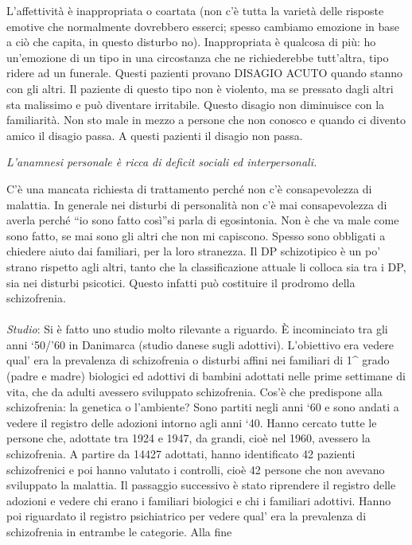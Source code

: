 L'affettività è inappropriata o coartata (non c'è tutta la varietà delle
risposte emotive che normalmente dovrebbero esserci; spesso cambiamo
emozione in base a ciò che capita, in questo disturbo no). Inappropriata
è qualcosa di più: ho un'emozione di un tipo in una circostanza che ne
richiederebbe tutt'altra, tipo ridere ad un funerale. Questi pazienti
provano DISAGIO ACUTO quando stanno con gli altri. Il paziente di questo
tipo non è violento, ma se pressato dagli altri sta malissimo e può
diventare irritabile. Questo disagio non diminuisce con la familiarità.
Non sto male in mezzo a persone che non conosco e quando ci divento
amico il disagio passa. A questi pazienti il disagio non passa.

\emph{\emph{L'anamnesi personale è ricca di deficit sociali ed
interpersonali. }}

C'è una mancata richiesta di trattamento perché non c'è consapevolezza
di malattia. In generale nei disturbi di personalità non c'è mai
consapevolezza di averla perché ``io sono fatto così''si parla di
egosintonia. Non è che va male come sono fatto, se mai sono gli altri
che non mi capiscono. Spesso sono obbligati a chiedere aiuto dai
familiari, per la loro stranezza. Il DP schizotipico è un po' strano
rispetto agli altri, tanto che la classificazione attuale li colloca sia
tra i DP, sia nei disturbi psicotici. Questo infatti può costituire il
prodromo della schizofrenia.
\\\\
\emph{Studio}: Si è fatto uno studio molto rilevante a riguardo. È
incominciato tra gli anni `50/'60 in Danimarca (studio danese sugli
adottivi). L'obiettivo era vedere qual' era la prevalenza di
schizofrenia o disturbi affini nei familiari di 1\^{} grado (padre e
madre) biologici ed adottivi di bambini adottati nelle prime settimane
di vita, che da adulti avessero sviluppato schizofrenia. Cos'è che
predispone alla schizofrenia: la genetica o l'ambiente? Sono partiti
negli anni `60 e sono andati a vedere il registro delle adozioni intorno
agli anni `40. Hanno cercato tutte le persone che, adottate tra 1924 e
1947, da grandi, cioè nel 1960, avessero la schizofrenia. A partire da
14427 adottati, hanno identificato 42 pazienti schizofrenici e poi hanno
valutato i controlli, cioè 42 persone che non avevano sviluppato la
malattia. Il passaggio successivo è stato riprendere il registro delle
adozioni e vedere chi erano i familiari biologici e chi i familiari
adottivi. Hanno poi riguardato il registro psichiatrico per vedere qual'
era la prevalenza di schizofrenia in entrambe le categorie. Alla fine
